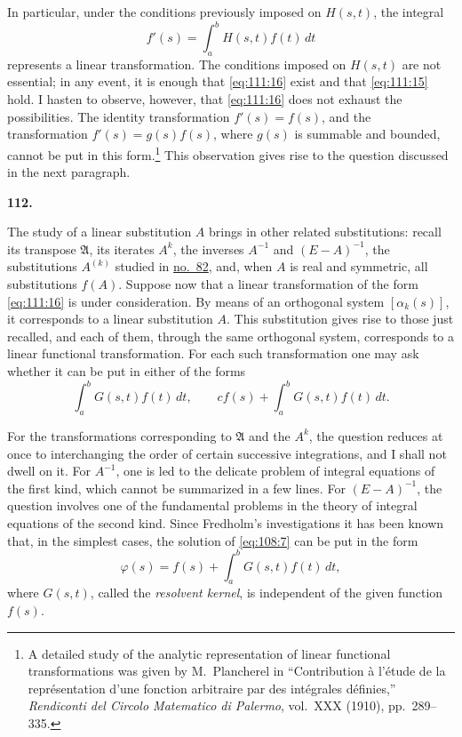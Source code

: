 \documentclass[
  paper=b5,
  fontsize=13pt,
  twoside=true,
  open=any,
  bookmarkpackage=false,
  chapterprefix=true,
  headings=normal
]{scrbook}
\theoremstyle{definition}
\newcommand{\numberedparagraph}[1]{%
  \par\medskip\phantomsection\label{sec:#1}%
  \noindent\textbf{#1.}\enspace
}
\begin{document}
In particular, under the conditions previously imposed on \(H(s,t)\), the
integral
\begin{equation}
  f'(s)=\int_a^bH(s,t)f(t)\,dt
  \tag{16}\label{eq:111:16}
\end{equation}
represents a linear transformation.  The conditions imposed on \(H(s,t)\) are
not essential; in any event, it is enough that \eqref{eq:111:16} exist and
that \eqref{eq:111:15} hold.  I hasten to observe, however, that
\eqref{eq:111:16} does not exhaust the possibilities.  The identity
transformation \(f'(s)=f(s)\), and the transformation
\(f'(s)=g(s)f(s)\), where \(g(s)\) is summable and bounded, cannot be put in
this form.\footnote{A detailed study of the analytic representation of linear
functional transformations was given by M.~Plancherel in ``Contribution à
l'étude de la représentation d'une fonction arbitraire par des intégrales
définies,'' \emph{Rendiconti del Circolo Matematico di Palermo}, vol.~XXX
(1910), pp.~289--335.}  This observation gives rise to the question discussed
in the next paragraph.

\numberedparagraph{112}
The study of a linear substitution \(A\) brings in
other related substitutions: recall its transpose \(\mathfrak A\), its
iterates \(A^k\), the inverses \(A^{-1}\) and \((E-A)^{-1}\), the substitutions
\(A^{(k)}\) studied in \hyperref[sec:82]{no.~82}, and, when \(A\) is real and
symmetric, all substitutions \(f(A)\).  Suppose now that a linear
transformation of the form \eqref{eq:111:16} is under consideration.  By means
of an orthogonal system \([\alpha_k(s)]\), it corresponds to a linear
substitution \(A\).  This substitution gives rise to those just recalled, and
each of them, through the same orthogonal system, corresponds to a linear
functional transformation.  For each such transformation one may ask whether
it can be put in either of the forms
\[
  \int_a^bG(s,t)f(t)\,dt,
  \qquad
  cf(s)+\int_a^bG(s,t)f(t)\,dt.
\]

For the transformations corresponding to \(\mathfrak A\) and the \(A^k\), the
question reduces at once to interchanging the order of certain successive
integrations, and I shall not dwell on it.  For \(A^{-1}\), one is led to the
delicate problem of integral equations of the first kind, which cannot be
summarized in a few lines.  For \((E-A)^{-1}\), the question involves one of
the fundamental problems in the theory of integral equations of the second
kind.  Since Fredholm's investigations it has been known that, in the simplest
cases, the solution of \eqref{eq:108:7} can be put in the form
\[
  \varphi(s)=f(s)+\int_a^bG(s,t)f(t)\,dt,
\]
where \(G(s,t)\), called the \emph{resolvent kernel}, is independent of the
given function \(f(s)\).
\end{document}
